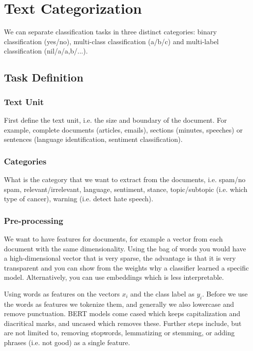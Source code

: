 \section{Text Categorization}

We can separate classification tasks in three distinct
categories: binary classification (yes/no), multi-class
classification (a/b/c) and multi-label
classification (nil/a/a,b/...).

\subsection{Task Definition}

\subsubsection{Text Unit}

First define the text unit, i.e. the size and boundary
of the document. For example, complete documents (articles,
emails), sections (minutes, speeches) or sentences (language
identification, sentiment classification).

\subsubsection{Categories}

What is the category that we want to extract from the documents,
i.e. spam/no spam, relevant/irrelevant, language, sentiment, stance,
topic/subtopic (i.e. which type of cancer), warning (i.e. detect hate
speech).

\subsubsection{Pre-processing}

We want to have features for documents, for example a vector
from each document with the same dimensionality. Using the bag
of words you would have a high-dimensional vector that is very
sparse, the advantage is that it is very transparent and you can
show from the weights why a classifier learned a specific model.
Alternatively, you can use embeddings which is less interpretable.

Using words as features on the vectors $x_i$ and the class label
as $y_i$. Before we use the words as features we tokenize them, and
generally we also lowercase and remove punctuation. BERT models
come cased which keeps capitalization and diacritical marks, and uncased
which removes these.
Further steps include, but are not limited to, removing stopwords,
lemmatizing or stemming, or adding phrases (i.e. not good)
as a single feature.

